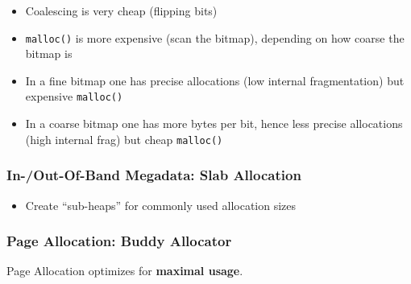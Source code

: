 \begin{itemize}
    \item Coalescing is very cheap (flipping bits)
    \item \lstinline{malloc()} is more expensive (scan the bitmap), depending on how coarse the bitmap is
    \item In a fine bitmap one has precise allocations (low internal fragmentation) but expensive \lstinline{malloc()}
    \item In a coarse bitmap one has more bytes per bit, hence less precise allocations (high internal frag) but cheap \lstinline{malloc()}
\end{itemize}


\subsubsection{In-/Out-Of-Band Megadata: Slab Allocation}

\begin{itemize}
    \item Create ``sub-heaps'' for commonly used allocation sizes
\end{itemize}


\subsubsection{Page Allocation: Buddy Allocator}
Page Allocation optimizes for \textbf{maximal usage}.

